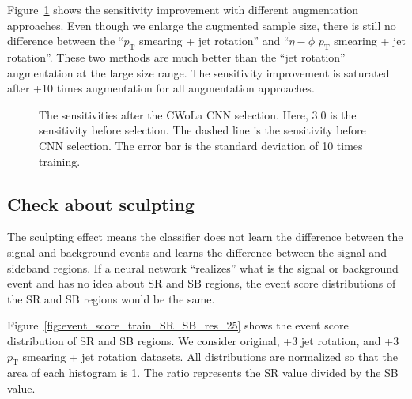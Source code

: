 \documentclass[12pt]{article}
\begin{document}
        Figure~\ref{fig:sensitivity_improvement_summary_aug_3_to_33_SB_3} shows the sensitivity improvement with different augmentation approaches. Even though we enlarge the augmented sample size, there is still no difference between the ``$p_{\text{T}}$ smearing + jet rotation'' and ``$\eta-\phi$ $p_{\text{T}}$ smearing + jet rotation''. These two methods are much better than the ``jet rotation'' augmentation at the large size range. The sensitivity improvement is saturated after +10 times augmentation for all augmentation approaches.
        \begin{figure}[htpb]
            \centering
            \caption{The sensitivities after the CWoLa CNN selection. Here, $3.0$ is the sensitivity before selection. The dashed line is the sensitivity before CNN selection. The error bar is the standard deviation of 10 times training.}
            \label{fig:sensitivity_improvement_summary_aug_3_to_33_SB_3}
        \end{figure}
    \subsection{Check about sculpting}%
    \label{sub:check_about_sculpting}
        The sculpting effect means the classifier does not learn the difference between the signal and background events and learns the difference between the signal and sideband regions. If a neural network ``realizes'' what is the signal or background event and has no idea about SR and SB regions, the event score distributions of the SR and SB regions would be the same.

        Figure~\ref{fig:event_score_train_SR_SB_res_25} shows the event score distribution of SR and SB regions. We consider original, +3 jet rotation, and +3 $p_{\text{T}}$ smearing + jet rotation datasets. All distributions are normalized so that the area of each histogram is 1. The ratio represents the SR value divided by the SB value.
\end{document}
